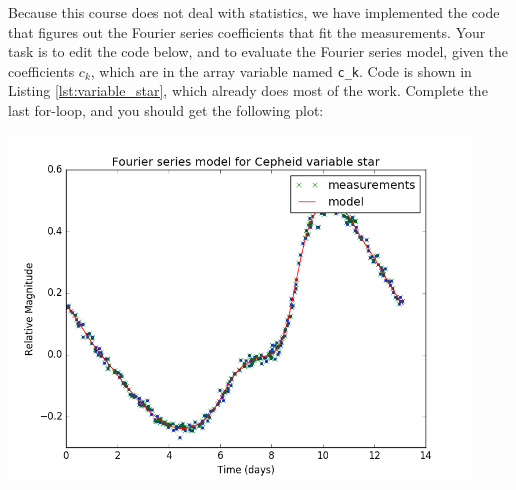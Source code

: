 Because this course does not deal with statistics, we have implemented
the code that figures out the Fourier series coefficients that fit the
measurements. Your task is to edit the code below, and to evaluate the
Fourier series model, given the coefficients $c_k$, which are in the
array variable named \verb|c_k|. Code is shown in Listing
\ref{lst:variable_star}, which already does most of the work. Complete
the last for-loop, and you should get the following plot:
\begin{center}
\includegraphics[width=0.92\textwidth]{Applications/figures/ceph.png}
\end{center}




